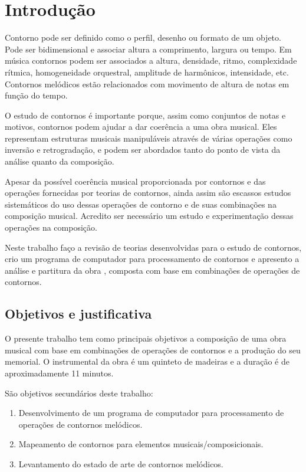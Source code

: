 \chapter{Introdução}
\label{cha:introducao}

Contorno pode ser definido como o perfil, desenho ou formato de um
objeto. Pode ser bidimensional e associar altura a comprimento,
largura ou tempo. Em música contornos podem ser associados a altura,
densidade, ritmo, complexidade rítmica, homogeneidade orquestral,
amplitude de harmônicos, intensidade, etc. Contornos melódicos estão
relacionados com movimento de altura de notas em função do tempo.

O estudo de contornos é importante porque, assim como conjuntos de
notas e motivos, contornos podem ajudar a dar coerência a uma obra
musical. Eles representam estruturas musicais manipuláveis através de
várias operações como inversão e retrogradação, e podem ser abordados
tanto do ponto de vista da análise quanto da composição.

Apesar da possível coerência musical proporcionada por contornos e das
operações fornecidas por teorias de contornos, ainda assim são
escassos estudos sistemáticos do uso dessas operações de contorno e de
suas combinações na composição musical. Acredito ser necessário um
estudo e experimentação dessas operações na composição.

Neste trabalho faço a revisão de teorias desenvolvidas para o estudo
de contornos, crio um programa de computador para processamento de
contornos e apresento a análise e partitura da obra \obra{}, composta
com base em combinações de operações de contornos.

\section{Objetivos e justificativa}
\label{sec:objet-e-just}

O presente trabalho tem como principais objetivos a composição de uma
obra musical com base em combinações de operações de contornos e a
produção do seu memorial. O instrumental da obra é um quinteto de
madeiras e a duração é de aproximadamente 11 minutos.

São objetivos secundários deste trabalho:

\begin{enumerate}
\item Desenvolvimento de um programa de computador para processamento
  de operações de contornos melódicos.
\item Mapeamento de contornos para elementos musicais/composicionais.
\item Levantamento do estado de arte de contornos melódicos.
\end{enumerate}

